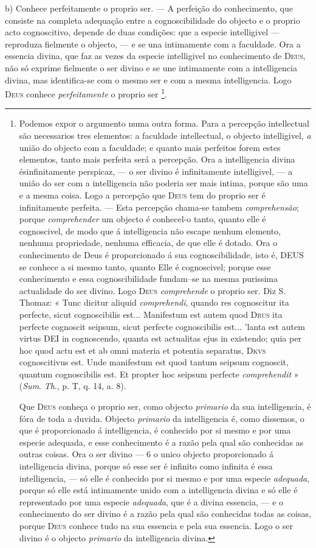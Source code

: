 b) Conhece perfeitamente o proprio ser. --- A perfeição do conhecimento, que consiste na completa adequação entre a cognoscibilidade do objecto e o proprio acto cognoscitivo, depende de duas condições: que a especie intelligivel --- reproduza fielmente o objecto, --- e se una intimamente com a faculdade. Ora a essencia divina, que faz as vezes da especie intelligivel no conhecimento de \textsc{Deus}, não só exprime fielmente o ser divino e se une intimamente com a intelligencia divina, mas identifica-se com o mesmo ser e com a mesma intelligencia. Logo \textsc{Deus} conhece \emph{perfeitamente} o proprio ser \footnote{Podemos expor o argumento numa outra forma. Para a percepção intellectual são necessarios tres elementos: a faculdade intellectual, o objecto intelligivel, \emph{a} união do objecto com a faculdade; e quanto mais perfeitos forem estes elementos, tanto mais perfeita será a percepção. Ora a intelligencia divina ésinfinitamente perspicaz, --- o ser divino é infinitamente intelligivel, --- a união do ser com a intelligencia não poderia ser mais intima, porque são uma e a mesma coisa. Logo a percepção que \textsc{Deus} tem do proprio ser é infinitamente perfeita. --- Esta percepção chama-se tambem \emph{comprehensão}; porque \emph{comprehender} um objecto é conhecel-o tanto, quanto elle é cognoscivel, de modo que á intelligencia não escape nenhum elemento, nenhuma propriedade, nenhuma efficacia, de que elle é dotado. Ora o conhecimento de Deus é proporcionado á sua cognoscibilidade, isto é, \textsc{DEUS} se conhece a si mesmo tanto, quanto Elle é cognoscivel; porque esse conhecimento e essa cognoscibilidade fundam--se na mesma purissima actualidade do ser divino. Logo \textsc{Deus} \emph{comprehende} o proprio ser. Diz S. Thomaz: « Tunc dicitur aliquid \emph{comprehendi}, quando res cognoscitur ita perfecte, sicut cognoscibilis est... Manifestum est autem quod \textsc{Drus} ita perfecte cognoscit seipsum, sicut perfecte cognoscibilis est... 'lanta est autem virtus DEI in cognoscendo, quanta est actualitas ejus in existendo; quia per hoc quod actu est et ab omni materia et potentia separatus, \textsc{Dkvs} cognoscitivus est. Unde manifestum est quod tantum seipsum cognoscit, quantum cognoscibilis est. Et propter hoc seipsum perfecte \emph{comprehendit} » (\emph{Sum}. \emph{Th}., p. T, q. 14, a. 8).\par Que \textsc{Deus} conheça o proprio ser, como objecto \emph{primario} da sua intelligencia, é fóra de toda a duvida. Objecto \emph{primario} da intelligencia é, como dissemos, o que é proporcionado á intelligencia, é conhecido por si mesmo e por uma especie adequada, e esse conhecimento é a razão pela qual são conhecidas as outras coisas. Ora o ser divino --- 6 o unico objecto proporcionado á intelligencia divina, porque só esse ser é infinito como infinita é essa intelligencia, --- só elle é conhecido por si mesmo e por uma especie \emph{adequada}, porque só elle está intimamente unido com a intelligencia divina e só elle é representado por uma especie \emph{adequada}, que é a divina essencia, --- e o conhecimento do ser divino é a razão pela qual são conhecidas todas as coisas, porque \textsc{Deus} conhece tudo na sua essencia e pela sua essencia. \textbar{} Logo o ser divino é o objecto \emph{primario} da intelligencia divina.}.

